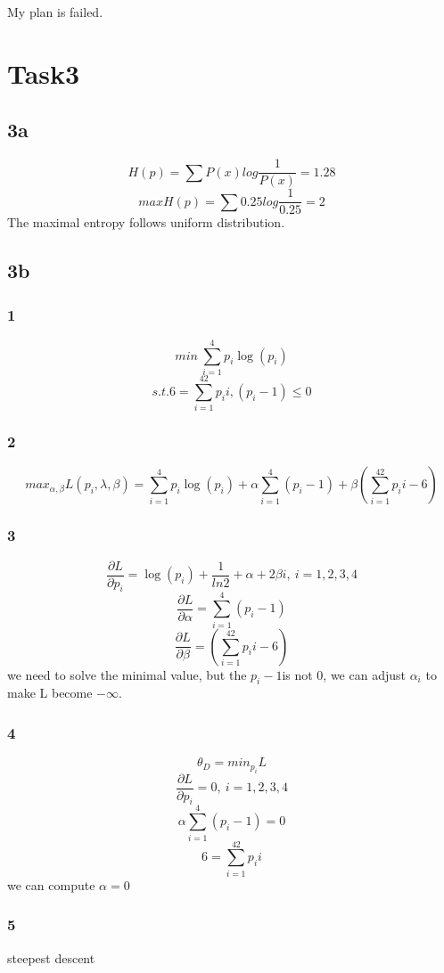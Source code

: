 \documentclass{article}
\begin{document}
My plan is failed.
\section{Task3}
\subsection{3a}
$$H(p)=\sum P(x)log\frac{1}{P(x)}=1.28$$
$$max H(p)=\sum0.25log\frac{1}{0.25}=2$$
The maximal entropy follows uniform distribution.
\subsection{3b}
\subsubsection{1}
$$min \ \sum_{i=1}^4p_i\log(p_i)$$
$$s.t.  6=\sum_{i=1}^42p_i i,(p_i-1)\leq0$$
\subsubsection{2}
$$max_{\alpha,\beta} L(p_i,\lambda,\beta)=\sum_{i=1}^4p_i\log(p_i)+\alpha\sum_{i=1}^4 (p_i-1)+\beta(\sum_{i=1}^42p_ii-6)$$
\subsubsection{3}
$$\frac{\partial L}{\partial p_i}=\log(p_i)+\frac{1}{ln2}+\alpha+2\beta i,\  i=1,2,3,4$$
$$\frac{\partial L}{\partial \alpha}=\sum_{i=1}^4 (p_i-1)$$
$$\frac{\partial L}{\partial \beta}=(\sum_{i=1}^42p_ii-6)$$
we need to solve the minimal value, but the $p_i-1$is not 0, we can adjust $\alpha_i$ to make L become $-\infty$.
\subsubsection{4}
$$\theta_{D}=min_{p_i}L$$
$$\frac{\partial L}{\partial p_i}=0,\  i=1,2,3,4$$
$$\alpha\sum_{i=1}^4 (p_i-1)=0$$
$$6=\sum_{i=1}^42p_i i$$
we can compute $\alpha=0$
\subsubsection{5}
steepest descent
\end{document}
